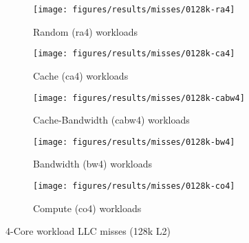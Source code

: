 \begin{figure}
    \centering
    \begin{subfigure}[b]{\textwidth}
            \texttt{[image: figures/results/misses/0128k-ra4]}
            \caption{Random (ra4) workloads}
            \label{fig:results:4core:misses:random}
    \end{subfigure}

    \begin{subfigure}[b]{0.5\textwidth}
            \texttt{[image: figures/results/misses/0128k-ca4]}
            \caption{Cache (ca4) workloads}
            \label{fig:results:4core:misses:cache}
    \end{subfigure}%
    \begin{subfigure}[b]{0.5\textwidth}
            \texttt{[image: figures/results/misses/0128k-cabw4]}
            \caption{Cache-Bandwidth (cabw4) workloads}
            \label{fig:results:4core:misses:cache-bw}
    \end{subfigure}

    \begin{subfigure}[b]{0.5\textwidth}
            \texttt{[image: figures/results/misses/0128k-bw4]}
            \caption{Bandwidth (bw4) workloads}
            \label{fig:results:4core:misses:bw}
    \end{subfigure}%
    \begin{subfigure}[b]{0.5\textwidth}
            \texttt{[image: figures/results/misses/0128k-co4]}
            \caption{Compute (co4) workloads}
            \label{fig:results:4core:misses:co}
    \end{subfigure}%

    \caption{4-Core workload LLC misses (128k L2)}\label{fig:results:4core:misses}
\end{figure}



